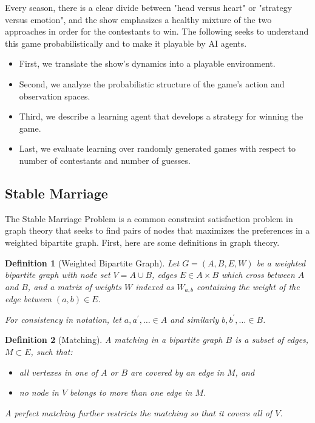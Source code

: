 \documentclass{article}
\newtheorem{definition}{Definition}[section]
\newcommand{\cross}{ \ensuremath{\times} }
\newcommand{\union}{ \ensuremath{\cup} }
\begin{document}
Every season, there is a clear divide between "head versus heart"
or "strategy versus emotion", and the show emphasizes a healthy
mixture of the two approaches in order for the contestants to win.
The following seeks to understand this game probabilistically and
to make it playable by AI agents.

\begin{itemize}
  \item First, we translate the show's dynamics into a
        playable environment.
  \item Second, we analyze the probabilistic structure of
        the game's action and observation spaces.
  \item Third, we describe a learning agent that develops
        a strategy for winning the game.
  \item Last, we evaluate learning over randomly
        generated games with respect to number of contestants
        and number of guesses.
\end{itemize}


\subsection{Stable Marriage}

The Stable Marriage Problem is a common constraint satisfaction problem
in graph theory that seeks to find pairs of nodes that maximizes the
preferences in a weighted bipartite graph. First, here are some
definitions in graph theory.

\begin{definition}[Weighted Bipartite Graph]
  Let $G = (A, B, E, W)$ be a weighted bipartite graph with node
  set $V = A \union B$, edges $E \in A \cross B$ which cross
  between $A$ and $B$, and a matrix of weights $W$ indexed as
  $W_{a,b}$ containing the weight of the edge between $(a, b) \in E$.

  For consistency in notation, let $a, a^{\prime}, \ldots \in A$
  and similarly $b, b^{\prime}, \ldots \in B$.
\end{definition}

\begin{definition}[Matching]
  A matching in a bipartite graph $B$ is a subset of edges,
  $M \subset E$, such that:

  \begin{itemize}
    \item all vertexes in one of $A$ or $B$ are covered by an edge in $M$, and
    \item no node in $V$ belongs to more than one edge in $M$.
  \end{itemize}

  A perfect matching further restricts the matching so that it
  covers all of $V$.
\end{definition}
\end{document}
